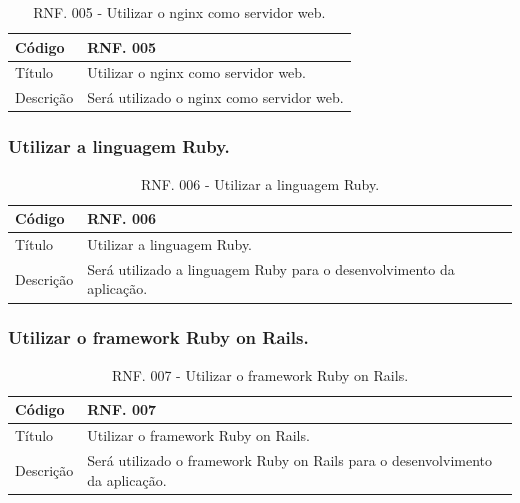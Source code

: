 \documentclass[11pt]{article}
\begin{document}
        \begin{table}[h]
          \begin{center}
            \begin{tabular}{ | p{5cm} | p{10cm} | }
              \hline
              Código\cellcolor{gray} & RNF. 005\cellcolor{gray} \\
              \hline
              Título & Utilizar o nginx como servidor web. \\
              \hline
              Descrição & Será utilizado o nginx como servidor web. \\
              \hline
            \end{tabular}
            \caption{RNF. 005 - Utilizar o nginx como servidor web.}
          \end{center}
        \end{table}

      \subsubsection{Utilizar a linguagem Ruby.}

        \begin{table}[h]
          \begin{center}
            \begin{tabular}{ | p{5cm} | p{10cm} | }
              \hline
              Código\cellcolor{gray} & RNF. 006\cellcolor{gray} \\
              \hline
              Título & Utilizar a linguagem Ruby. \\
              \hline
              Descrição & Será utilizado a linguagem Ruby para o desenvolvimento da aplicação. \\
              \hline
            \end{tabular}
            \caption{RNF. 006 - Utilizar a linguagem Ruby.}
          \end{center}
        \end{table}

    \clearpage
        
      \subsubsection{Utilizar o framework Ruby on Rails.}

        \begin{table}[h]
          \begin{center}
            \begin{tabular}{ | p{5cm} | p{10cm} | }
              \hline
              Código\cellcolor{gray} & RNF. 007\cellcolor{gray} \\
              \hline
              Título & Utilizar o framework Ruby on Rails. \\
              \hline
              Descrição & Será utilizado o framework Ruby on Rails para o desenvolvimento da aplicação. \\
              \hline
            \end{tabular}
            \caption{RNF. 007 - Utilizar o framework Ruby on Rails.}
          \end{center}
        \end{table}
\end{document}
